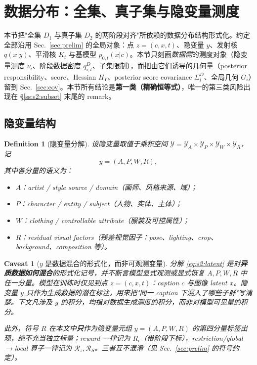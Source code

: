 \documentclass[11pt,a4paper]{article}
\newtheorem{definition}[theorem]{Definition}
\newtheorem{caveat}[theorem]{Caveat}
\newcommand{\cY}{\mathcal{Y}}
\newcommand{\Rstr}{\mathcal{R}}     %
\begin{document}
\section{数据分布：全集、真子集与隐变量测度}\label{sec:data}

本节把"全集 $D_1$ 与真子集 $D_2$ 的两阶段对齐"所依赖的数据分布结构形式化。约定全部沿用 Sec.~\ref{sec:prelim} 的全局对象：点 $z=(c,x,t)$、隐变量 $y$、发射核 $q(x|y)$、平滑核 $K_t$ 与基模型 $p_{0,t}(x|c)$。本节只刻画\emph{数据侧}的测度对象（隐变量测度 $\nu_i$、阶段数据密度 $q_{i,t}^D$、子集限制），而把由它们诱导的几何量（posterior responsibility、score、Hessian $H_Y$、posterior score covariance $\Sigma_i^D$、全局几何 $G_i$）留到 Sec.~\ref{sec:cov}。本节所有结论是\textbf{第一类（精确恒等式）}，唯一的第三类风险出现在 \S\ref{ss:s2:subset} 末尾的 remark。

\subsection{隐变量结构}\label{ss:s2:latent}

\begin{definition}[隐变量分解]\label{def:s2:latent}
设隐变量取值于乘积空间 $\cY=\cY_A\times\cY_P\times\cY_W\times\cY_R$，记
\begin{equation}\label{eq:s2:latent}
y=(A,P,W,R),
\end{equation}
其中各分量的语义为：
\begin{itemize}
  \item $A$：artist / style source / domain（画师、风格来源、域）；
  \item $P$：character / entity / subject（人物、实体、主体）；
  \item $W$：clothing / controllable attribute（服装及可控属性）；
  \item $R$：residual visual factors（残差视觉因子：pose、lighting、crop、background、composition 等）。
\end{itemize}
\end{definition}

\begin{caveat}[$y$ 是数据混合的形式化，而非可观测变量]\label{cav:s2:notobserved}
分解 \eqref{eq:s2:latent} 是对\textbf{异质数据如何混合}的形式化记号，并\emph{不}断言模型显式观测或显式恢复 $A,P,W,R$ 中任一分量。模型在训练时仅见到点 $z=(c,x,t)$：caption $c$ 与图像 latent $x$。隐变量 $y$ 只作为生成数据的潜在标注，用来把"同一 caption 下混入了哪些子群"写清楚。下文凡涉及 $y$ 的积分，均指对数据生成测度的积分，而非对模型可见量的积分。

此外，符号 $R$ 在本文中\textbf{只}作为隐变量元组 $y=(A,P,W,R)$ 的第四分量标签出现，绝不充当独立标量；reward 一律记为 $R_i$（带阶段下标），restriction/global$\to$local 算子一律记为 $\Rstr_z,\Rstr_S$。三者互不混淆（见 Sec.~\ref{sec:prelim} 的符号约定）。
\end{caveat}
\end{document}
